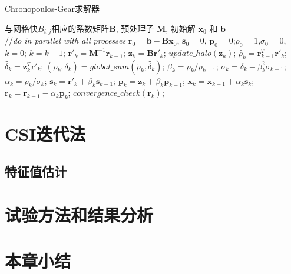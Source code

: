 \begin{algorithm}[!t]
\caption{Chronopoulos-Gear求解器}
\label{alg:pcg}
\begin{algorithmic}[1]
\REQUIRE   与网格快$B_{i,j}$相应的系数矩阵$\textbf{B}$, 预处理子 $\textbf{M}$, 初始解 $\textbf{x}_0$ 和 $\textbf{b}$  \\
//\qquad    \textit{do in parallel with all processes}
\STATE $\textbf{r}_0 = \textbf{b}-\textbf{B}\textbf{x}_0$, $\textbf{s}_0 =0$, $\textbf{p}_0 =0$;\quad $\rho_0=1$,$\sigma_0=0$, $k=0$;
\STATE $k=k+1$;
\STATE $\textbf{r}'_{k} =\textbf{M}^{-1}\textbf{r}_{k-1}$; \label{pcg_scale0} 
\STATE $\textbf{z}_k = \textbf{B}\textbf{r}'_{k}$; \label{pcg_mat}
\STATE $update\_halo(\textbf{z}_{k})$;  \label{pcg_bc1}
\STATE $\tilde{\rho_k} = \textbf{r}_{k-1}^T\textbf{r}'_{k}$;\label{pcg_dot1}
\STATE $\tilde{\delta_k} = \textbf{z}_k^T\textbf{r}'_k$;\label{pcg_dot2}
\STATE $(\rho_k,\delta_k) = global\_sum(\tilde{\rho_k},\tilde{\delta_k})$;\label{pcg_global1} 
\STATE $\beta_k = \rho_k / \rho_{k-1}$;\label{pcg_beta}
\STATE $\sigma_k = \delta_k - \beta_k^2\sigma_{k-1}$;\label{pcg_sigma}
\STATE $\alpha_k = \rho_k /\sigma_{k}$;\label{pcg_alpha}
\STATE $\textbf{s}_k = \textbf{r}'_{k} +\beta_k\textbf{s}_{k-1}$;\label{pcg_scale1}
\STATE $\textbf{p}_k = \textbf{z}_{k} +\beta_k\textbf{p}_{k-1}$;\label{pcg_scale2}
\STATE $\textbf{x}_k =\textbf{x}_{k-1} +\alpha_k \textbf{s}_k$;\label{pcg_scale3}
\STATE $\textbf{r}_k =\textbf{r}_{k-1} -\alpha_k\textbf{p}_k$;\label{pcg_scale4}
\STATE $convergence\_check(\textbf{r}_{k})$;  
\ENDWHILE
\end{algorithmic}
\end{algorithm}

\section{CSI迭代法}
\label{sec:barocsi}

\subsection{特征值估计}
\label{sec:barocsi}

\section{试验方法和结果分析}
\label{sec:verifyExp}

\section{本章小结}
\label{sec:verifyConclusion}




